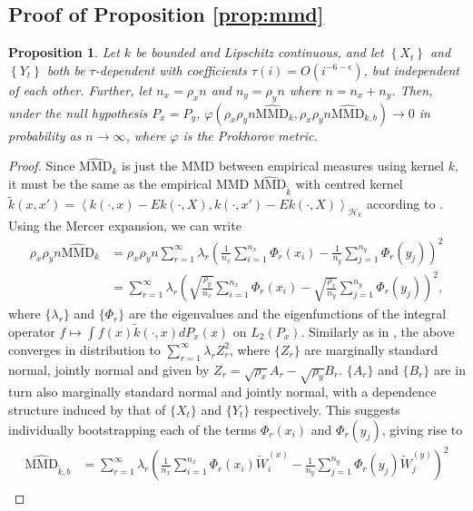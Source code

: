 \documentclass{article} %
\newtheorem*{proposition*}{Proposition}
\newcommand{\ev}{E}
\newcommand{\Hk}{\ensuremath{\mathcal{H}_k}}%
\begin{document}
\subsection{Proof of Proposition \ref{prop:mmd} }
  \label{sub:prop:mmd}
\begin{proposition*}
 Let $k$ be bounded and Lipschitz continuous, and let $\left\{ X_t \right\}$ and $\left\{ Y_t \right\}$ 
 both be $\tau$-dependent with coefficients $\tau(i) =  O(i^{-6-\epsilon})$, but independent of each other. Further, let $n_x=\rho_x n$ and $n_y=\rho_y n$ where $n=n_x+n_y$. Then, under the null hypothesis $P_x=P_y$, $\varphi\left(\rho_x \rho_y n\widehat{\text{MMD}}_k, \rho_x \rho_y n\widehat{\text{MMD}}_{k,b}\right)\to 0$ in probability as $n\to\infty$, where $\varphi$ is the Prokhorov metric.
\end{proposition*}
  \begin{proof}
  Since $\widehat{\text{MMD}}_k$ is just the MMD between empirical measures
using kernel $k$, it must be the same as the empirical MMD $\widehat{\text{MMD}}_{\tilde k}$ with centred kernel $\tilde{k}(x,x')=\left \langle k(\cdot,x)-\ev k(\cdot,X), k(\cdot,x')-\ev k(\cdot,X) \right \rangle_{\Hk}$ according to \cite[Theorem 22]{SejSriGreFuk13}. Using the Mercer expansion, we can write
\begin{align*}
\rho_x \rho_y n\widehat{\text{MMD}}_k & = \rho_{x}\rho_{y}n\sum_{r=1}^{\infty}\lambda_{r}\left(\frac{1}{n_{x}}\sum_{i=1}^{n_{x}}\Phi_{r}(x_{i})-\frac{1}{n_{y}}\sum_{j=1}^{n_{y}}\Phi_{r}(y_{j})\right)^{2}\\
 & = \sum_{r=1}^{\infty}\lambda_{r}\left(\sqrt{\frac{\rho_{y}}{n_{x}}}\sum_{i=1}^{n_{x}}\Phi_{r}(x_{i})-\sqrt{\frac{\rho_{x}}{n_{y}}}\sum_{j=1}^{n_{y}}\Phi_{r}(y_{j})\right)^{2},
\end{align*}
where $\{\lambda_r\}$ and $\{\Phi_r\}$ are the eigenvalues and the eigenfunctions of the integral operator $f\mapsto \int f(x)\tilde k(\cdot,x)dP_x(x)$ on $L_2(P_x)$. Similarly as in \cite[Theorem 2.1]{leucht_dependent_2013}, the above converges in distribution to $\sum_{r=1}^\infty \lambda_r Z_r^2$, where $\{Z_r\}$ are marginally standard normal, jointly normal and given by $Z_r=\sqrt{\rho_x}A_r-\sqrt{\rho_y}B_r$. $\{A_r\}$ and $\{B_r\}$ are in turn also marginally standard normal and jointly normal, with a dependence structure induced by that of $\{X_t\}$ and $\{Y_t\}$ respectively. This suggests individually bootstrapping each of the terms $\Phi_{r}(x_{i})$ and $\Phi_{r}(y_{j})$, giving rise to 
\begin{align*}
\widehat{\text{MMD}}_{\tilde k, b}&=\sum_{r=1}^{\infty}\lambda_{r}\left(\frac{1}{n_{x}}\sum_{i=1}^{n_{x}}\Phi_{r}(x_{i})\tilde W_i^{(x)}-\frac{1}{n_{y}}\sum_{j=1}^{n_{y}}\Phi_{r}(y_{j})\tilde W_j^{(y)}\right)^{2}\\

\end{align*}
\end{proof}
\end{document}
